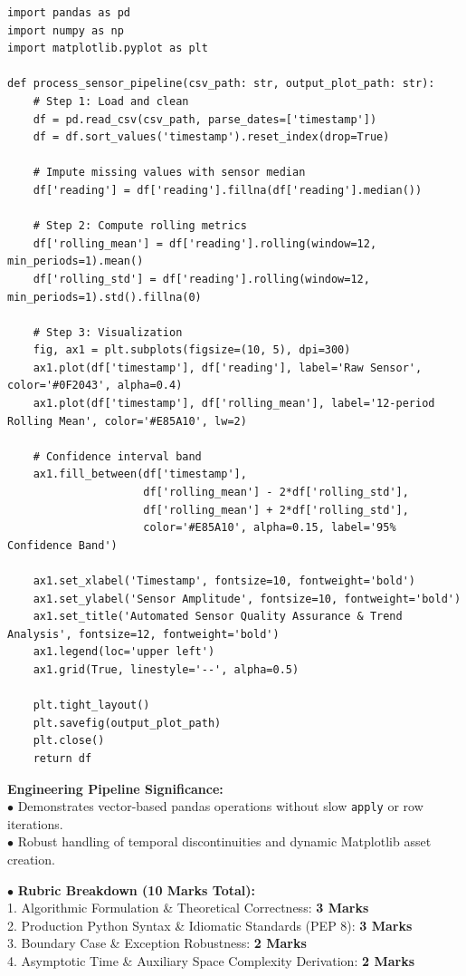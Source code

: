 \begin{solbox}
\begin{lstlisting}
import pandas as pd
import numpy as np
import matplotlib.pyplot as plt

def process_sensor_pipeline(csv_path: str, output_plot_path: str):
    # Step 1: Load and clean
    df = pd.read_csv(csv_path, parse_dates=['timestamp'])
    df = df.sort_values('timestamp').reset_index(drop=True)
    
    # Impute missing values with sensor median
    df['reading'] = df['reading'].fillna(df['reading'].median())
    
    # Step 2: Compute rolling metrics
    df['rolling_mean'] = df['reading'].rolling(window=12, min_periods=1).mean()
    df['rolling_std'] = df['reading'].rolling(window=12, min_periods=1).std().fillna(0)
    
    # Step 3: Visualization
    fig, ax1 = plt.subplots(figsize=(10, 5), dpi=300)
    ax1.plot(df['timestamp'], df['reading'], label='Raw Sensor', color='#0F2043', alpha=0.4)
    ax1.plot(df['timestamp'], df['rolling_mean'], label='12-period Rolling Mean', color='#E85A10', lw=2)
    
    # Confidence interval band
    ax1.fill_between(df['timestamp'], 
                     df['rolling_mean'] - 2*df['rolling_std'], 
                     df['rolling_mean'] + 2*df['rolling_std'], 
                     color='#E85A10', alpha=0.15, label='95% Confidence Band')
    
    ax1.set_xlabel('Timestamp', fontsize=10, fontweight='bold')
    ax1.set_ylabel('Sensor Amplitude', fontsize=10, fontweight='bold')
    ax1.set_title('Automated Sensor Quality Assurance & Trend Analysis', fontsize=12, fontweight='bold')
    ax1.legend(loc='upper left')
    ax1.grid(True, linestyle='--', alpha=0.5)
    
    plt.tight_layout()
    plt.savefig(output_plot_path)
    plt.close()
    return df
\end{lstlisting}
\textbf{Engineering Pipeline Significance:}\\
$\bullet$ Demonstrates vector-based pandas operations without slow \texttt{apply} or row iterations.\\
$\bullet$ Robust handling of temporal discontinuities and dynamic Matplotlib asset creation.
\end{solbox}

\begin{examinertip}
$\bullet$ \textbf{Rubric Breakdown (10 Marks Total):}\\
1. Algorithmic Formulation \& Theoretical Correctness: \textbf{3 Marks}\\
2. Production Python Syntax \& Idiomatic Standards (PEP 8): \textbf{3 Marks}\\
3. Boundary Case \& Exception Robustness: \textbf{2 Marks}\\
4. Asymptotic Time \& Auxiliary Space Complexity Derivation: \textbf{2 Marks}
\end{examinertip}
